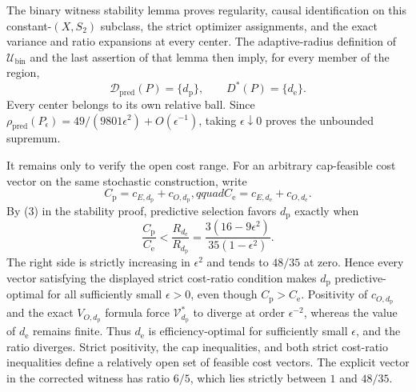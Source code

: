 The binary witness stability lemma proves regularity, causal identification on this constant-\((X,S_2)\) subclass, the strict optimizer assignments, and the exact variance and ratio expansions at every center.  The adaptive-radius definition of \(\mathcal U_{\mathrm{bin}}\) and the last assertion of that lemma then imply, for every member of the region,
\[
 \mathcal D_{\mathrm{pred}}(P)=\{d_{\mathrm p}\},\qquad
 D^*(P)=\{d_{\mathrm e}\}.
\]
Every center belongs to its own relative ball.  Since
\(\rho_{\mathrm{pred}}(P_\epsilon)=49/(9801\epsilon^2)+O(\epsilon^{-1})\), taking \(\epsilon\downarrow0\) proves the unbounded supremum.

It remains only to verify the open cost range.  For an arbitrary cap-feasible cost vector on the same stochastic construction, write
\[
 C_{\mathrm p}=c_{E,d_{\mathrm p}}+c_{O,d_{\mathrm p}},qquad
 C_{\mathrm e}=c_{E,d_{\mathrm e}}+c_{O,d_{\mathrm e}}.
\]
By (3) in the stability proof, predictive selection favors \(d_{\mathrm p}\) exactly when
\[
 \frac{C_{\mathrm p}}{C_{\mathrm e}}
 <\frac{R_{d_{\mathrm e}}}{R_{d_{\mathrm p}}}
 =\frac{3(16-9\epsilon^2)}{35(1-\epsilon^2)}. \tag{1}
\]
The right side is strictly increasing in \(\epsilon^2\) and tends to \(48/35\) at zero.  Hence every vector satisfying the displayed strict cost-ratio condition makes \(d_{\mathrm p}\) predictive-optimal for all sufficiently small \(\epsilon>0\), even though \(C_{\mathrm p}>C_{\mathrm e}\).  Positivity of \(c_{O,d_{\mathrm p}}\) and the exact \(V_{O,d_{\mathrm p}}\) formula force \(\mathcal V_{d_{\mathrm p}}^*\) to diverge at order \(\epsilon^{-2}\), whereas the value of \(d_{\mathrm e}\) remains finite.  Thus \(d_{\mathrm e}\) is efficiency-optimal for sufficiently small \(\epsilon\), and the ratio diverges.  Strict positivity, the cap inequalities, and both strict cost-ratio inequalities define a relatively open set of feasible cost vectors.  The explicit vector in the corrected witness has ratio \(6/5\), which lies strictly between \(1\) and \(48/35\).